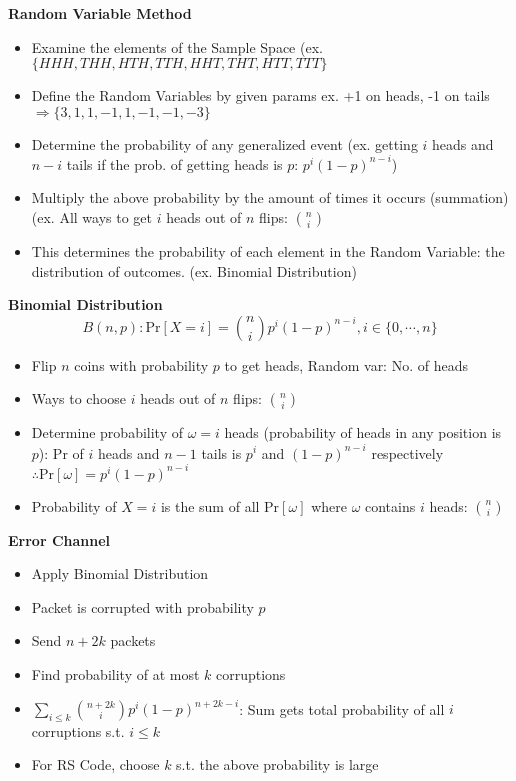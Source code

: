 \documentclass{article}\usepackage{amsmath,amssymb,amsthm,tikz,tkz-graph,color,chngpage,soul,hyperref,csquotes,graphicx,floatrow, listings}\newcommand*{\QEDB}{\hfill\ensuremath{\square}}\newtheorem*{prop}{Proposition}\renewcommand{\theenumi}{\alph{enumi}}\usepackage[shortlabels]{enumitem}\usepackage[nobreak=true]{mdframed}\usetikzlibrary{matrix,calc}\MakeOuterQuote{"}\usepackage[margin=0.75in]{geometry} \newtheorem{theorem}{Theorem}\newcommand{\Z}{\mathbb Z}\newcommand{\R}{\mathbb R}\newcommand{\Q}{\mathbb Q}\newcommand{\N}{\mathbb N}\newcommand{\x}[1]{\textrm{ #1 }}\newcommand{\pr}{\textrm{Pr}}
\newcommand{\sumlim}[3]{\sum\limits_{#1}^{#2}#3}
\newcommand{\eq}[1]{\begin{equation}#1\end{equation}}
\begin{document}
\begin{mdframed}
\textbf{Random Variable Method}
\begin{itemize}
    \item Examine the elements of the Sample Space (ex. $\{HHH,THH,HTH,TTH,HHT,THT,HTT,TTT\}$
    \item Define the Random Variables by given params ex. +1 on heads, -1 on tails $\Rightarrow \{3,1,1,-1,1,-1,-1,-3\}$
    \item Determine the probability of any generalized event (ex. getting $i$ heads and $n-i$ tails if the prob. of getting heads is $p$: $p^i(1-p)^{n-i}$)
    \item Multiply the above probability by the amount of times it occurs (summation) (ex. All ways to get $i$ heads out of $n$ flips: $\binom{n}{i}$
    \item This determines the probability of each element in the Random Variable: the distribution of outcomes. (ex. Binomial Distribution)
\end{itemize}
\end{mdframed}
\begin{mdframed}
\textbf{Binomial Distribution}
\eq{B(n,p): \pr[X=i]=\binom{n}{i}p^i(1-p)^{n-i}, i\in\{0,\cdots,n\}}
\begin{itemize}
    \item Flip $n$ coins with probability $p$ to get heads, Random var: No. of heads
    \item Ways to choose $i$ heads out of $n$ flips: $\binom{n}{i}$
    \item Determine probability of $\omega=i$ heads (probability of heads in any position is $p$): $\pr$ of $i$ heads and $n-1$ tails is $p^i$ and $(1-p)^{n-i}$ respectively $\therefore \pr[\omega]=p^i(1-p)^{n-i}$
    \item Probability of $X=i$ is the sum of all $\pr[\omega]$ where $\omega$ contains $i$ heads: $\binom{n}{i}$
\end{itemize}
\end{mdframed}
\textbf{Error Channel}
\begin{itemize}
    \item Apply Binomial Distribution
    \item Packet is corrupted with probability $p$
    \item Send $n+2k$ packets
    \item Find probability of at most $k$ corruptions
    \item $\sumlim{i \le k}{}{\binom{n+2k}{i}p^i(1-p)^{n+2k-i}}$: Sum gets total probability of all $i$ corruptions s.t. $i\le k$
    \item For RS Code, choose $k$ s.t. the above probability is large
\end{itemize}
\end{document}

